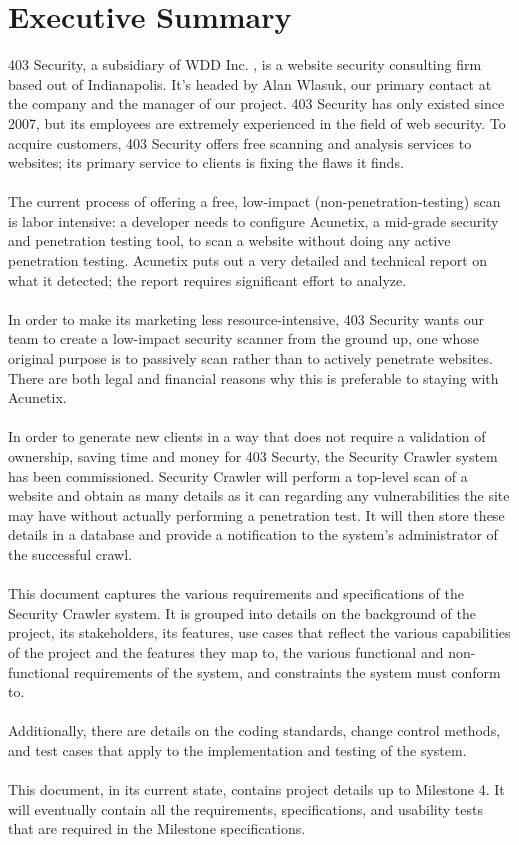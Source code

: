 \section{Executive Summary}
403 Security, a subsidiary of WDD Inc. , is a website security consulting firm based out of Indianapolis.  It’s headed by Alan Wlasuk, our primary contact at the company and the manager of our project. 403 Security has only existed  since 2007, but its employees are extremely experienced in the field of web security. To acquire customers, 403 Security offers free scanning and analysis services to websites; its primary service to clients is fixing the flaws it finds.\\\\
The current process of offering a free, low-impact (non-penetration-testing) scan is labor intensive: a developer needs to configure Acunetix, a mid-grade security and penetration testing tool, to scan a website without doing any active penetration testing. Acunetix puts out a very detailed and technical report on what it detected; the report requires significant effort to analyze.\\\\
In order to make its marketing less resource-intensive, 403 Security wants our team to create a low-impact security scanner from the ground up, one whose original purpose is to passively scan rather than to actively penetrate websites. There are both legal and financial reasons why this is preferable to staying with Acunetix.\\\\
In order to generate new clients in a way that does not require a validation of ownership, saving time and money for 403 Securty, the Security Crawler system has been commissioned.  Security Crawler will perform a top-level scan of a website and obtain as many details as it can regarding any vulnerabilities the site may have without actually performing a penetration test.  It will then store these details in a database and provide a notification to the system's administrator of the successful crawl.\\\\
This document captures the various requirements and specifications of the Security Crawler system.  It is grouped into details on the background of the project, its stakeholders, its features, use cases that reflect the various capabilities of the project and the features they map to, the various functional and non-functional requirements of the system, and constraints the system must conform to.\\\\
Additionally, there are details on the coding standards, change control methods, and test cases that apply to the implementation and testing of the system.\\\\
This document, in its current state, contains project details up to Milestone 4.  It will eventually contain all the requirements, specifications, and usability tests that are required in the Milestone specifications.\\\\